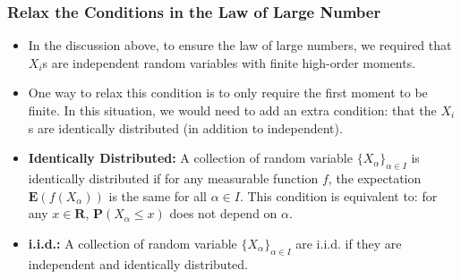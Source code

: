 \documentclass[handout]{beamer}
\newcommand{\BP}{\mathbf{P}}
\newcommand{\BE}{\mathbf{E}}
\begin{document}
\frame
{
  \frametitle{Relax the Conditions in the Law of Large Number}

\begin{itemize}
      
      \item<1-> In the discussion above, to ensure the law of large numbers, we required that $X_i$s are independent random variables with finite high-order moments. 
      
      
      \item<2-> One way to relax this condition is to only require the first moment to be finite. In this situation, we would need to add an extra condition: that the $X_i$s are identically distributed (in addition to independent). 
      
      \item<3-> \textbf{Identically Distributed:}  A collection of random variable $\{X_{\alpha}\}_{\alpha\in I}$ is identically distributed if for any measurable function $f$, the expectation $\BE(f(X_{\alpha}) )$ is the same for all $\alpha \in I$. This condition is equivalent to: for any $x \in \mathbf{R}$, $\BP(X_{\alpha}\leq x)$ does not depend on $\alpha$.   
      
      \item<4-> \textbf{i.i.d.:}  A collection of random variable $\{X_{\alpha}\}_{\alpha\in I}$ are i.i.d. if they are independent and identically distributed. 
                                      
\end{itemize}
}
\end{document}
